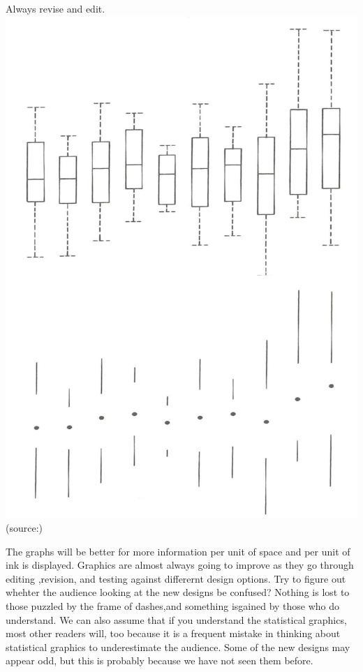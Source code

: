 \documentclass[]{book}
\theoremstyle{definition}
\theoremstyle{definition}
\theoremstyle{definition}
\theoremstyle{remark}
\begin{document}
\begin{enumerate}
  Always revise and edit. \includegraphics{images/Tufte_figure4.png}
  (source:\citep{Tufte_2001})
\end{enumerate}

The graphs will be better for more information per unit of space and per
unit of ink is displayed. Graphics are almost always going to improve as
they go through editing ,revision, and testing against differernt design
options. Try to figure out whehter the audience looking at the new
designs be confused? Nothing is lost to those puzzled by the frame of
dashes,and something isgained by those who do understand. We can also
assume that if you understand the statistical graphics, most other
readers will, too because it is a frequent mistake in thinking about
statistical graphics to underestimate the audience. Some of the new
designs may appear odd, but this is probably because we have not seen
them before.
\end{document}
